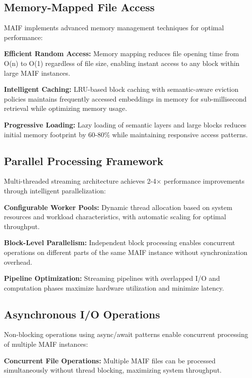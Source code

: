 \documentclass[conference]{IEEEtran}
\begin{document}
\subsection{Memory-Mapped File Access}

MAIF implements advanced memory management techniques for optimal performance:

\textbf{Efficient Random Access:} Memory mapping reduces file opening time from O(n) to O(1) regardless of file size, enabling instant access to any block within large MAIF instances.

\textbf{Intelligent Caching:} LRU-based block caching with semantic-aware eviction policies maintains frequently accessed embeddings in memory for sub-millisecond retrieval while optimizing memory usage.

\textbf{Progressive Loading:} Lazy loading of semantic layers and large blocks reduces initial memory footprint by 60-80\% while maintaining responsive access patterns.

\subsection{Parallel Processing Framework}

Multi-threaded streaming architecture achieves 2-4× performance improvements through intelligent parallelization:

\textbf{Configurable Worker Pools:} Dynamic thread allocation based on system resources and workload characteristics, with automatic scaling for optimal throughput.

\textbf{Block-Level Parallelism:} Independent block processing enables concurrent operations on different parts of the same MAIF instance without synchronization overhead.

\textbf{Pipeline Optimization:} Streaming pipelines with overlapped I/O and computation phases maximize hardware utilization and minimize latency.

\subsection{Asynchronous I/O Operations}

Non-blocking operations using async/await patterns enable concurrent processing of multiple MAIF instances:

\textbf{Concurrent File Operations:} Multiple MAIF files can be processed simultaneously without thread blocking, maximizing system throughput.
\end{document}
